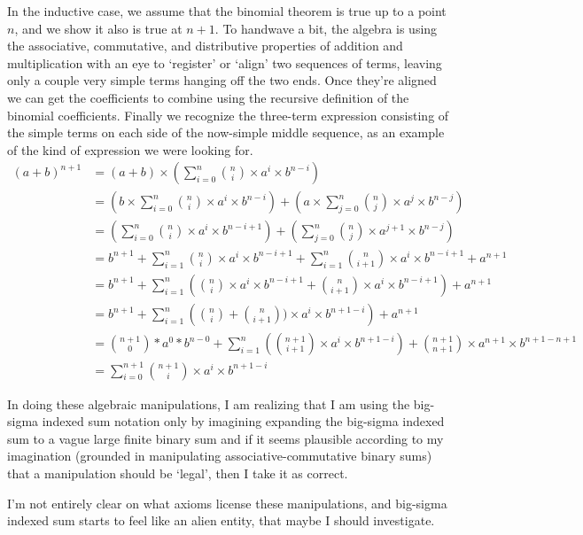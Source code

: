 \documentclass{proc-l}
\theoremstyle{definition}
\theoremstyle{remark}
\numberwithin{equation}{section}
\begin{document}
In the inductive case, we assume that the binomial theorem is true up to a point \(n\), and we show it also is true at \(n+1\). To handwave a bit, the algebra is using the associative, commutative, and distributive properties of addition and multiplication
with an eye to `register' or `align' two sequences of terms, leaving only a couple very simple terms hanging off the two ends.
Once they're aligned we can get the coefficients to combine using the recursive definition of the binomial coefficients.
Finally we recognize the three-term expression consisting of the simple terms on each side of the now-simple middle sequence, as an example of the kind of expression we were looking for.
\begin{align*}
(a + b)^{n+1} 
& = (a + b) \times (\sum_{i=0}^n {n \choose i} \times a^i \times b^{n-i}) \\ 
& = (b \times \sum_{i=0}^n {n \choose i} \times a^i \times b^{n-i}) + (a \times \sum_{j=0}^n {n \choose j} \times a^j \times b^{n-j}) \\
& = \left(\sum_{i=0}^n {n \choose i} \times a^i \times b^{n-i+1}\right) + \left(\sum_{j=0}^n {n \choose j} \times a^{j+1} \times b^{n-j}\right) \\
& = b^{n+1} + \sum_{i=1}^n {n \choose i} \times a^i \times b^{n-i+1} + \sum_{i=1}^n {n \choose i+1} \times a^i \times b^{n-i+1} + a^{n+1} \\
& = b^{n+1} + \sum_{i=1}^n \left({n \choose i} \times a^i \times b^{n-i+1} + {n \choose i+1} \times a^i \times b^{n-i+1}\right) + a^{n+1} \\
& = b^{n+1} + \sum_{i=1}^n \left({n \choose i} + {n \choose i+1}) \times a^i \times b^{n+1-i}\right) + a^{n+1} \\
& = {n+1 \choose 0} * a^0 * b^{n-0} + \sum_{i=1}^n ({n+1 \choose i+1} \times a^i \times b^{n+1-i}) + {n+1 \choose n+1} \times a^{n+1} \times b^{n+1-n+1} \\
& = \sum_{i=0}^{n+1} {n+1 \choose i} \times a^i \times b^{n+1-i}
\end{align*}



In doing these algebraic manipulations, I am realizing that I am using the big-sigma indexed sum notation only by imagining expanding the big-sigma indexed sum to a vague large finite binary sum and if it seems plausible according to my imagination (grounded in manipulating associative-commutative binary sums)
that a manipulation should be `legal', then I take it as correct.

I'm not entirely clear on what axioms license these manipulations, and big-sigma indexed sum starts to feel like an alien entity, that maybe I should investigate.
\end{document}
